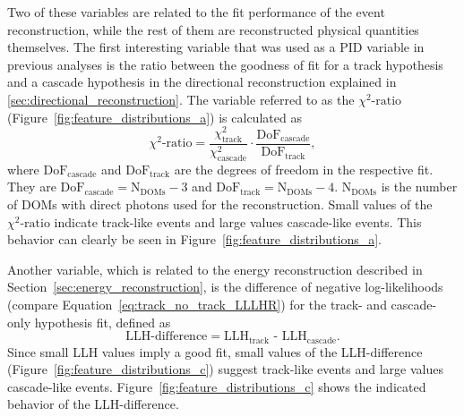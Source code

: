 Two of these variables are related to the fit performance of the event reconstruction, while the rest of them are reconstructed physical quantities themselves.
The first interesting variable that was used as a PID variable in previous analyses \cite{2017arXiv170205160I, ATerliuk} is the ratio between the goodness of fit for a track hypothesis and a cascade hypothesis in the directional reconstruction explained in \ref{sec:directional_reconstruction}.
The variable referred to as the $\chi^2\textrm{-ratio}$ (Figure~\ref{fig:feature_distributions_a}) is calculated as
\begin{equation}
    \chi^2\textrm{-ratio} = \frac{\chi^2_\mathrm{track}}{\chi^2_\mathrm{cascade}}\cdot\frac{\mathrm{DoF}_\mathrm{cascade}}{\mathrm{DoF}_\mathrm{track}},
\end{equation}
where $\mathrm{DoF}_\mathrm{cascade}$ and $\mathrm{DoF}_\mathrm{track}$ are the degrees of freedom in the respective fit.
They are $\mathrm{DoF}_\mathrm{cascade} = \mathrm{N}_\mathrm{DOMs}-3$ and $\mathrm{DoF}_\mathrm{track}=\mathrm{N}_\mathrm{DOMs}-4$.
$\mathrm{N}_\mathrm{DOMs}$ is the number of DOMs with direct photons used for the reconstruction.
Small values of the $\chi^2\textrm{-ratio}$ indicate track-like events and large values cascade-like events.
This behavior can clearly be seen in Figure~\ref{fig:feature_distributions_a}.

Another variable, which is related to the energy reconstruction described in Section~\ref{sec:energy_reconstruction}, is the difference of negative log-likelihoods (compare Equation~\ref{eq:track_no_track_LLLHR}) for the track- and cascade-only hypothesis fit, defined as
\begin{equation}
    \textrm{LLH-difference} = \textrm{LLH}_\mathrm{track}\textrm{ - LLH}_\mathrm{cascade}.
\end{equation}
Since small LLH values imply a good fit, small values of the LLH-difference (Figure~\ref{fig:feature_distributions_c}) suggest track-like events and large values cascade-like events.
Figure~\ref{fig:feature_distributions_c} shows the indicated behavior of the LLH-difference.

